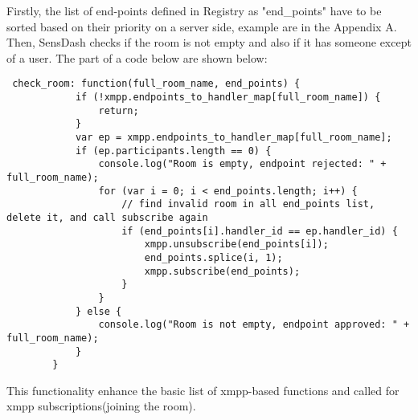 Firstly, the list of end-points defined in Registry as "end\_points" have to be sorted based on their priority on a server side, example are in the Appendix A. Then, SensDash checks if the room is not empty and also if it has someone except of a user. The part of a code below are shown below:
\begin{lstlisting}
 check_room: function(full_room_name, end_points) {
            if (!xmpp.endpoints_to_handler_map[full_room_name]) {
                return;
            }
            var ep = xmpp.endpoints_to_handler_map[full_room_name];
            if (ep.participants.length == 0) {
                console.log("Room is empty, endpoint rejected: " + full_room_name);
                for (var i = 0; i < end_points.length; i++) {
                    // find invalid room in all end_points list, delete it, and call subscribe again
                    if (end_points[i].handler_id == ep.handler_id) {
                        xmpp.unsubscribe(end_points[i]);
                        end_points.splice(i, 1);
                        xmpp.subscribe(end_points);
                    }
                }
            } else {
                console.log("Room is not empty, endpoint approved: " + full_room_name);
            }
        }
\end{lstlisting}
This functionality enhance the basic list of xmpp-based functions and called for xmpp subscriptions(joining the room).

